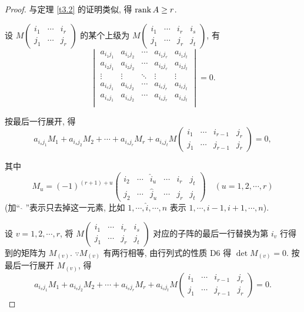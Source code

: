 \documentclass{ctexart}
\begin{document}
\begin{proof}
    与定理 \ref{t3.2} 的证明类似, 得 $\operatorname{rank} A\geq r$.

    设 $M\begin{pmatrix} i_1 & \cdots & i_r \\ j_1 & \cdots & j_r \end{pmatrix}$ 的某个上级为 $M\begin{pmatrix} i_1 & \cdots & i_r & i_s \\ j_1 & \cdots & j_r & j_t \end{pmatrix}$, 有
    \[\begin{vmatrix}
        a_{i_1j_1} & a_{i_1j_2} & \cdots & a_{i_1j_r} & a_{i_1j_t} \\
        a_{i_2j_1} & a_{i_2j_2} & \cdots & a_{i_2j_r} & a_{i_2j_t} \\
        \vdots & \vdots & \ddots & \vdots & \vdots \\
        a_{i_rj_1} & a_{i_rj_2} & \cdots & a_{i_rj_r} & a_{i_rj_t} \\
        a_{i_sj_1} & a_{i_sj_2} & \cdots & a_{i_sj_r} & a_{i_sj_t} \\
    \end{vmatrix}=0.\]

    按最后一行展开, 得
    \begin{equation}\label{eq3.1}
        a_{i_sj_1}M_1+a_{i_sj_2}M_2+\cdots+a_{i_sj_r}M_r+a_{i_sj_t}M\begin{pmatrix}
            i_1 & \cdots & i_{r-1} & j_r \\
            j_1 & \cdots & j_{r-1} & j_r
        \end{pmatrix}=0,
    \end{equation}

    其中
    \[M_u=(-1)^{(r+1)+u}\begin{pmatrix}
        i_2 & \cdots & \hat{i}_u & \cdots & i_r & j_t \\
        j_2 & \cdots & \hat{j}_u & \cdots & j_r & j_t
    \end{pmatrix}\quad(u=1,2,\cdots,r)\]
    (加`` $\hat{}$ ''表示只去掉这一元素, 比如 $1,\cdots,\hat{i},\cdots,n$ 表示 $1,\cdots,i-1,i+1,\cdots,n$).
    
    设 $v=1,2,\cdots,r$, 将 $M\begin{pmatrix} i_1 & \cdots & i_r & i_s \\ j_1 & \cdots & j_r & j_t \end{pmatrix}$ 对应的子阵的最后一行替换为第 $i_v$ 行得到的矩阵为 $M_{(v)}$. $\because M_{(v)}$ 有两行相等, 由行列式的性质 D6 得 $\det M_{(v)}=0$. 按最后一行展开 $M_{(v)}$, 得
    \[a_{i_vj_1}M_1+a_{i_vj_2}M_2+\cdots+a_{i_vj_r}M_r+a_{i_vj_t}M\begin{pmatrix}
        i_1 & \cdots & i_{r-1} & j_r \\
        j_1 & \cdots & j_{r-1} & j_r
    \end{pmatrix}=0.\]


\end{proof}
\end{document}
